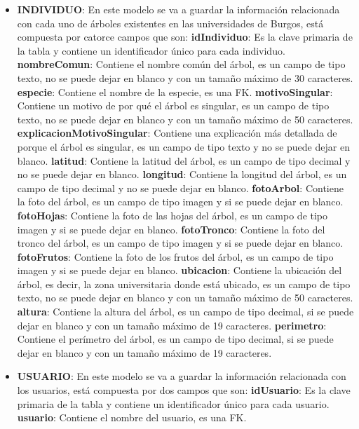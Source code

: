 \begin{itemize}
	\item \textbf{INDIVIDUO}: En este modelo se va a guardar la información relacionada con cada uno de árboles existentes en las universidades de Burgos, está compuesta por catorce campos que son:
	\subitem \textbf{idIndividuo}: Es la clave primaria de la tabla y contiene un identificador único para cada individuo.
	\subitem \textbf{nombreComun}: Contiene el nombre común del árbol, es un campo de tipo texto, no se puede dejar en blanco y con un tamaño máximo de 30 caracteres. 
	\subitem \textbf{especie}: Contiene el nombre de la especie, es una FK.
	\subitem \textbf{motivoSingular}: Contiene un motivo de por qué el árbol es singular, es un campo de tipo texto, no se puede dejar en blanco y con un tamaño máximo de 50 caracteres. 
	\subitem \textbf{explicacionMotivoSingular}: Contiene una explicación más detallada de porque el árbol es singular, es un campo de tipo texto y no se puede dejar en blanco.
	\subitem \textbf{latitud}: Contiene la latitud del árbol, es un campo de tipo decimal y no se puede dejar en blanco.
	\subitem \textbf{longitud}: Contiene la longitud del árbol, es un campo de tipo decimal y no se puede dejar en blanco.
	\subitem \textbf{fotoArbol}: Contiene la foto del árbol, es un campo de tipo imagen y si se puede dejar en blanco.
	\subitem \textbf{fotoHojas}: Contiene la foto de las hojas del árbol, es un campo de tipo imagen y si se puede dejar en blanco.
	\subitem \textbf{fotoTronco}: Contiene la foto del tronco del árbol, es un campo de tipo imagen y si se puede dejar en blanco.
	\subitem \textbf{fotoFrutos}: Contiene la foto de los frutos del árbol, es un campo de tipo imagen y si se puede dejar en blanco.
	\subitem \textbf{ubicacion}: Contiene la ubicación del árbol, es decir, la zona universitaria donde está ubicado, es un campo de tipo texto, no se puede dejar en blanco y con un tamaño máximo de 50 caracteres. 
	\subitem \textbf{altura}: Contiene la altura del árbol, es un campo de tipo decimal, si se puede dejar en blanco y con un tamaño máximo de 19 caracteres.
	\subitem \textbf{perimetro}: Contiene el perímetro del árbol, es un campo de tipo decimal, si se puede dejar en blanco y con un tamaño máximo de 19 caracteres.  
\end{itemize}


\begin{itemize}
	\item \textbf{USUARIO}: En este modelo se va a guardar la información relacionada con los usuarios, está compuesta por dos campos que son:
	\subitem \textbf{idUsuario}: Es la clave primaria de la tabla y contiene un identificador único para cada usuario.
	\subitem \textbf{usuario}: Contiene el nombre del usuario, es una FK. 
\end{itemize}

